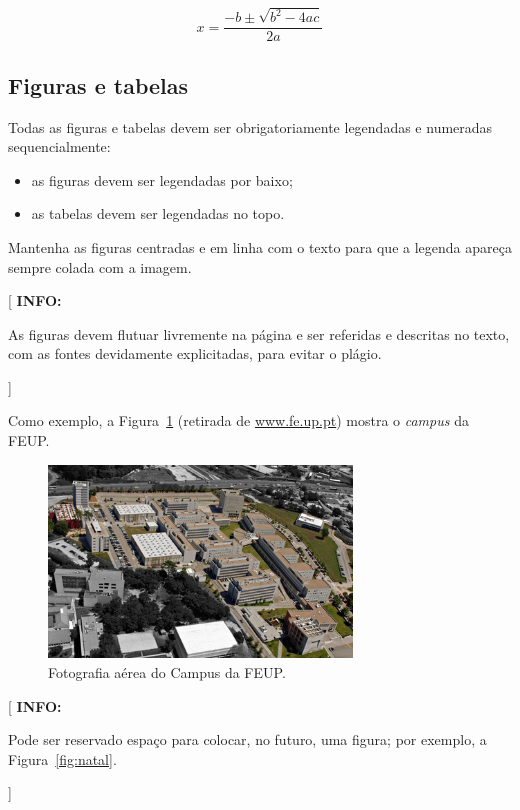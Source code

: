 \documentclass[11pt,a4paper]{report}
\newenvironment{info}[1]{\vspace*{6mm}\color{blue}
                            [ \textbf{INFO:} \begin{em} #1}
                        {\vspace*{3mm}\end{em} ]}
\begin{document}
\begin{equation} \label{eq:2}
  x=\frac{-b\pm \sqrt{b^2-4ac}}{2a}
\end{equation}

\subsection*{Figuras e tabelas}

Todas as figuras e tabelas devem ser obrigatoriamente legendadas e
numeradas sequencialmente:

\begin{itemize}
\item as figuras devem ser legendadas por baixo;
\item as tabelas devem ser legendadas no topo. 
\end{itemize}

Mantenha as figuras centradas e em linha com o texto para que a
legenda apareça sempre colada com a imagem.

\begin{info}
As figuras devem flutuar livremente na página e ser referidas e
descritas no texto, com as fontes devidamente explicitadas, para
evitar o plágio.
\end{info}

Como exemplo, a Figura~\ref{fig:campus} (retirada de
\url{www.fe.up.pt}) mostra o \emph{campus} da FEUP. 

\lipsum[4]

\begin{figure}
\centering
\includegraphics[width=0.72\textwidth]{campus}
\caption{Fotografia aérea do Campus da FEUP.} \label{fig:campus}
\end{figure}

\lipsum[4]

\begin{info}
Pode ser reservado espaço para colocar, no futuro, uma figura; por
exemplo, a Figura~\ref{fig:natal}.
\end{info}
\end{document}
